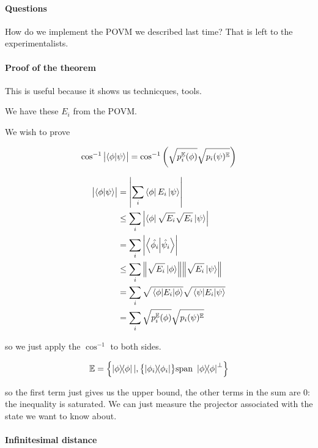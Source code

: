 

\paragraph{Questions}

How do we implement the POVM we described last time? That is left to the experimentalists.

\paragraph{Proof of the theorem}

This is useful because it shows us technicques, tools.

We have these \( E _{i}  \) from the POVM.

We wish to prove

\begin{equation}
  \cos ^{-1} \abs{\braket{\phi}{\psi}}
  = \cos ^{-1} \qty(\sqrt{p_i ^{\mathbb{E}} (\phi)} \sqrt{p_i(\psi)^{\mathbb{E}}})
\end{equation}

\begin{align}
  \abs{\braket{\phi}{\psi}} &= \abs{\sum_i \bra{\phi} E_i \ket{\psi}}  \\
  &\leq \sum_i \abs{\bra{\phi} \sqrt{E _{i} } \sqrt{E _{i}} \ket{\psi}}  \\
  &= \sum _{i} \abs{\braket{\hat{\phi_i}}{\hat{\psi_i}}}  \\
  &\leq \sum_i \norm{\sqrt{E_i} \ket{\phi}}\norm{\sqrt{E_i} \ket{\psi}}  \\
  &= \sum_i \sqrt{\ev{E_i}{\phi}} \sqrt{\ev{E_i}{\psi}}  \\
  &= \sum_i \sqrt{p_i ^{\mathbb{E}} (\phi)} \sqrt{p_i(\psi)^{\mathbb{E}}}
\end{align}

so we just apply the \( \cos ^{-1} \) to both sides.

\begin{equation}
  \mathbb{E} = \qty{\ketbra{\phi} | , \qty{\ketbra{\phi_i}} \text{span } \ketbra{\phi}^{\perp}}
\end{equation}

so the first term just gives us the upper bound, the other terms in the sum are 0: the inequality is saturated. We can just measure the projector associated with the state we want to know about.

\paragraph{Infinitesimal distance}

